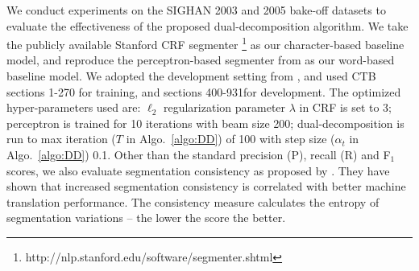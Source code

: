 We conduct experiments  on the SIGHAN 2003 \cite{Sproat:2003:SIGHAN} and 2005 \cite{Emerson:2005:SIGHAN} bake-off datasets to evaluate the effectiveness of the proposed dual-decomposition algorithm. We take the publicly available Stanford CRF segmenter \cite{Tseng:2005:SIGHAN}\footnote{http://nlp.stanford.edu/software/segmenter.shtml} as our character-based baseline model, and reproduce the perceptron-based segmenter from  as our word-based baseline model.
We adopted the development setting from \cite{Zhang:2007:ACL}, and used CTB sections 1-270 for training, and sections 400-931for development. The optimized hyper-parameters used are: $\ell_{2}$ regularization parameter $\lambda$ in CRF is set to $3$; perceptron is trained for 10 iterations with beam size 200; dual-decomposition is run to max iteration ($T$ in Algo.~\ref{algo:DD}) of 100 with step size ($\alpha_t$ in Algo.~\ref{algo:DD}) 0.1. Other than the standard precision (P), recall (R) and F$_1$ scores, we also evaluate segmentation consistency as proposed by \cite{Chang:2008:ACL}. They have shown that increased segmentation consistency is correlated with better machine translation performance. The consistency measure calculates the entropy of segmentation variations -- the lower the score the better.

